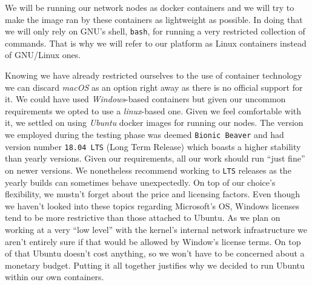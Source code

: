                 We will be running our network nodes as docker containers and we will try to make the image ran by these containers as lightweight as possible. In doing that we will only rely on GNU's shell, \texttt{bash}, for running a very restricted collection of commands. That is why we will refer to our platform as Linux containers instead of GNU/Linux ones.

            Knowing we have already restricted ourselves to the use of container technology we can discard \textit{macOS} as an option right away as there is no official support for it. We could have used \textit{Windows}-based containers but given our uncommon requirements we opted to use a \textit{linux}-based one. Given we feel comfortable with it, we settled on using \textit{Ubuntu} docker images for running our nodes. The version we employed during the testing phase was deemed \texttt{Bionic Beaver} and had version number \texttt{18.04 LTS} (Long Term Release) which boasts a higher stability than yearly versions. Given our requirements, all our work should run ``just fine'' on newer versions. We nonetheless recommend working to \texttt{LTS} releases as the yearly builds can sometimes behave unexpectedly. On top of our choice's flexibility, we mustn't forget about the price and licensing factors. Even though we haven't looked into these topics regarding Microsoft's OS, Windows licenses tend to be more restrictive than those attached to Ubuntu. As we plan on working at a very ``low level'' with the kernel's internal network infrastructure we aren't entirely sure if that would be allowed by Window's license terms. On top of that Ubuntu doesn't cost anything, so we won't have to be concerned about a monetary budget. Putting it all together justifies why we decided to run Ubuntu within our own containers.
